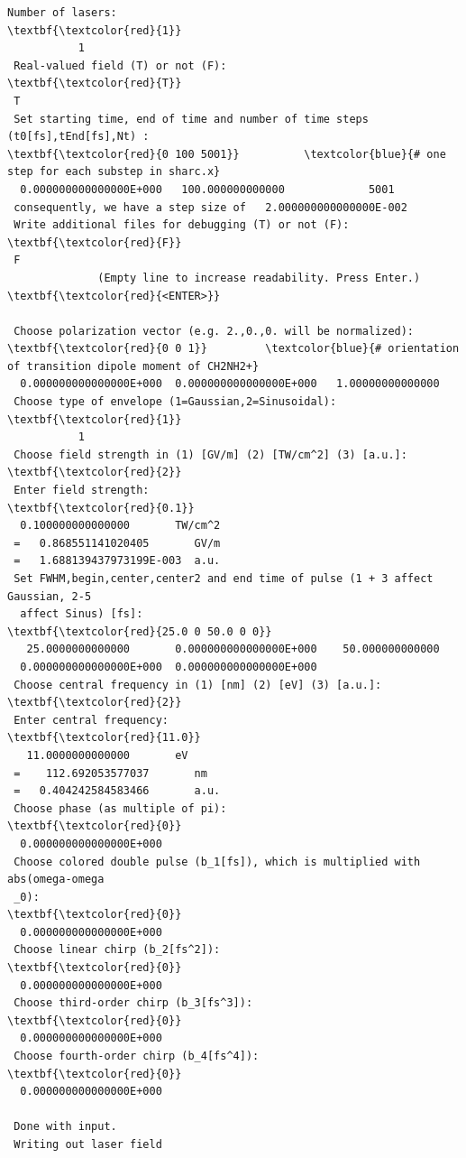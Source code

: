 \documentclass[a4paper,11pt,DIV=15,openany]{scrbook}
\begin{document}
\begin{oframed}
\footnotesize\begin{Verbatim}[commandchars=\\\{\}]
 Number of lasers:
\textbf{\textcolor{red}{1}}
           1
 Real-valued field (T) or not (F):
\textbf{\textcolor{red}{T}}
 T
 Set starting time, end of time and number of time steps (t0[fs],tEnd[fs],Nt) :
\textbf{\textcolor{red}{0 100 5001}}          \textcolor{blue}{# one step for each substep in sharc.x}
  0.000000000000000E+000   100.000000000000             5001
 consequently, we have a step size of   2.000000000000000E-002
 Write additional files for debugging (T) or not (F):
\textbf{\textcolor{red}{F}}
 F
              (Empty line to increase readability. Press Enter.)
\textbf{\textcolor{red}{<ENTER>}}
 
 Choose polarization vector (e.g. 2.,0.,0. will be normalized):
\textbf{\textcolor{red}{0 0 1}}         \textcolor{blue}{# orientation of transition dipole moment of CH2NH2+}
  0.000000000000000E+000  0.000000000000000E+000   1.00000000000000     
 Choose type of envelope (1=Gaussian,2=Sinusoidal):
\textbf{\textcolor{red}{1}}
           1
 Choose field strength in (1) [GV/m] (2) [TW/cm^2] (3) [a.u.]:
\textbf{\textcolor{red}{2}}
 Enter field strength:
\textbf{\textcolor{red}{0.1}}
  0.100000000000000       TW/cm^2
 =   0.868551141020405       GV/m
 =   1.688139437973199E-003  a.u.
 Set FWHM,begin,center,center2 and end time of pulse (1 + 3 affect Gaussian, 2-5
  affect Sinus) [fs]:
\textbf{\textcolor{red}{25.0 0 50.0 0 0}}
   25.0000000000000       0.000000000000000E+000    50.000000000000     
  0.000000000000000E+000  0.000000000000000E+000
 Choose central frequency in (1) [nm] (2) [eV] (3) [a.u.]:
\textbf{\textcolor{red}{2}}
 Enter central frequency:
\textbf{\textcolor{red}{11.0}}
   11.0000000000000       eV
 =    112.692053577037       nm
 =   0.404242584583466       a.u.
 Choose phase (as multiple of pi):
\textbf{\textcolor{red}{0}}
  0.000000000000000E+000
 Choose colored double pulse (b_1[fs]), which is multiplied with abs(omega-omega
 _0):
\textbf{\textcolor{red}{0}}
  0.000000000000000E+000
 Choose linear chirp (b_2[fs^2]):
\textbf{\textcolor{red}{0}}
  0.000000000000000E+000
 Choose third-order chirp (b_3[fs^3]):
\textbf{\textcolor{red}{0}}
  0.000000000000000E+000
 Choose fourth-order chirp (b_4[fs^4]):
\textbf{\textcolor{red}{0}}
  0.000000000000000E+000
 
 Done with input.
 Writing out laser field
\end{Verbatim}
\end{oframed}
\end{document}
